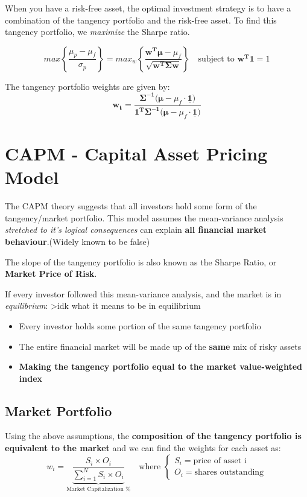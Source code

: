 \documentclass[
  oneside]{book}
\providecommand{\tightlist}{%
  \setlength{\itemsep}{0pt}\setlength{\parskip}{0pt}}
\begin{document}
When you have a risk-free asset, the optimal investment strategy is to have a combination of the tangency portfolio and the risk-free asset. To find this tangency portfolio, we \emph{maximize} the Sharpe ratio.

\[
max\left\{ \frac{\mu_{p}-\mu_{f}}{\sigma_{p}} \right\} = max_{w} \left\{ \frac{\mathbf{w^{T}\mu}-\mu_{f}}{\sqrt{ \mathbf{w^{T}\Sigma w} }} \right\} \quad \text{subject to } \mathbf{w^{T}1} = 1
\]

The tangency portfolio weights are given by:
\[
\mathbf{w_{t}} = \frac{\mathbf{\Sigma ^{-1}(\mu}-\mu_{f}\cdot \mathbf{\underline{1}})}{\mathbf{1^{T}\Sigma ^{-1}(\mu}-\mu_{f}\cdot \mathbf{\underline{1}})}
\]

\hypertarget{capm---capital-asset-pricing-model}{%
\section{CAPM - Capital Asset Pricing Model}\label{capm---capital-asset-pricing-model}}

The CAPM theory suggests that all investors hold some form of the tangency/market portfolio. This model assumes the mean-variance analysis \emph{stretched to it's logical consequences} can explain \textbf{all financial market behaviour}.(Widely known to be false)

The slope of the tangency portfolio is also known as the Sharpe Ratio, or \textbf{Market Price of Risk}.

If every investor followed this mean-variance analysis, and the market is in \emph{equilibrium}:
\textgreater idk what it means to be in equilibrium

\begin{itemize}
\tightlist
\item
  Every investor holds some portion of the same tangency portfolio
\item
  The entire financial market will be made up of the \textbf{same} mix of risky assets
\item
  \textbf{Making the tangency portfolio equal to the market value-weighted index}
\end{itemize}

\hypertarget{market-portfolio}{%
\subsection{Market Portfolio}\label{market-portfolio}}

Using the above assumptions, the \textbf{composition of the tangency portfolio is equivalent to the market} and we can find the weights for each asset as:
\[
w_{i} = \underbrace{ \frac{S_{i}\times O_{i}}{\sum^{N}_{i=1}S_{i}\times O_{i}} }_{ \text{Market Capitalization \%} } \quad \text{where } \begin{cases}
S_{i} = \text{price of asset i} \\
O_{i} = \text{shares outstanding}
\end{cases}
\]
\end{document}

